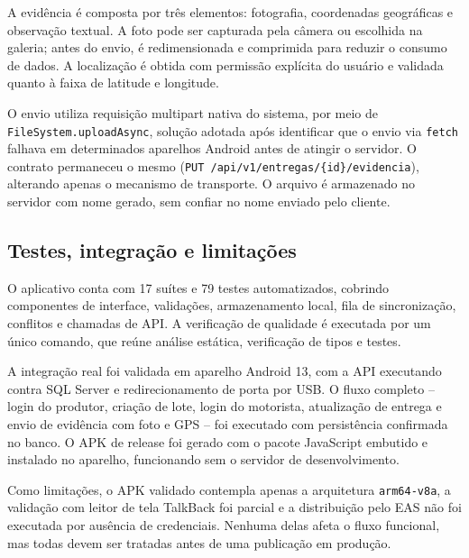 A evidência é composta por três elementos: fotografia, coordenadas geográficas e
observação textual. A foto pode ser capturada pela câmera ou escolhida na
galeria; antes do envio, é redimensionada e comprimida para reduzir o consumo de
dados. A localização é obtida com permissão explícita do usuário e validada
quanto à faixa de latitude e longitude.

O envio utiliza requisição multipart nativa do sistema, por meio de
\texttt{FileSystem.}\allowbreak\texttt{uploadAsync}, solução adotada após identificar que o envio
via \texttt{fetch} falhava em determinados aparelhos Android antes de atingir o
servidor. O contrato permaneceu o mesmo (\texttt{PUT
/api/v1/entregas/\{id\}/evidencia}), alterando apenas o mecanismo de transporte.
O arquivo é armazenado no servidor com nome gerado, sem confiar no nome enviado
pelo cliente.

\subsection{Testes, integração e limitações}

O aplicativo conta com 17 suítes e 79 testes automatizados, cobrindo componentes
de interface, validações, armazenamento local, fila de sincronização, conflitos e
chamadas de API. A verificação de qualidade é executada por um único comando, que
reúne análise estática, verificação de tipos e testes.

A integração real foi validada em aparelho Android 13, com a API executando
contra SQL Server e redirecionamento de porta por USB. O fluxo completo --
login do produtor, criação de lote, login do motorista, atualização de entrega e
envio de evidência com foto e GPS -- foi executado com persistência confirmada no
banco. O APK de release foi gerado com o pacote JavaScript embutido e instalado
no aparelho, funcionando sem o servidor de desenvolvimento.

Como limitações, o APK validado contempla apenas a arquitetura
\texttt{arm64-v8a}, a validação com leitor de tela TalkBack foi parcial e a
distribuição pelo EAS não foi executada por ausência de credenciais. Nenhuma
delas afeta o fluxo funcional, mas todas devem ser tratadas antes de uma
publicação em produção.
